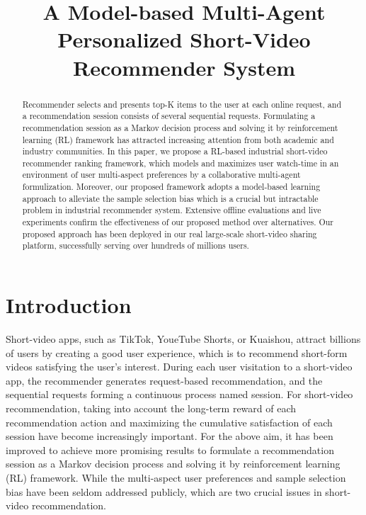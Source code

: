 
\title{A Model-based Multi-Agent Personalized Short-Video Recommender System}
\begin{abstract}

Recommender selects and presents top-K items to the user at each online request, and a recommendation session consists of several sequential requests. 
Formulating a recommendation session as a Markov decision process and solving it by reinforcement learning (RL) framework has attracted increasing attention from both academic and industry communities. 
In this paper, we propose a RL-based industrial short-video recommender ranking framework, which models and maximizes user watch-time in an environment of user multi-aspect preferences by a collaborative multi-agent formulization. Moreover, our proposed framework adopts a model-based learning approach to alleviate the sample selection bias which is a crucial but intractable problem in industrial recommender system.
Extensive offline evaluations and live experiments confirm the effectiveness of our proposed method over alternatives. 
Our proposed approach has been deployed in our real large-scale short-video sharing platform, successfully serving over hundreds of millions users.
\end{abstract}
\maketitle





\section{Introduction}
Short-video apps, such as TikTok, YoueTube Shorts, or Kuaishou, attract billions of users by creating a good user experience, which is to recommend short-form videos satisfying the user's interest.
During each user visitation to a short-video app, the recommender generates request-based recommendation, and the sequential requests forming a continuous process named session.
For short-video recommendation, taking into account the long-term reward of each recommendation action and maximizing the cumulative satisfaction of each session have become increasingly important. 
For the above aim, it has been improved to achieve more promising results to formulate a recommendation session as a Markov decision process and solving it by reinforcement learning (RL) framework.
While the multi-aspect user preferences and sample selection bias have been seldom addressed publicly, which are two crucial issues in short-video recommendation.

